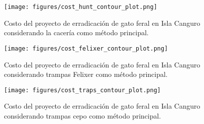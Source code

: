 \documentclass{article} %
\begin{document}
\begin{figure}[H]
\centering
\texttt{[image: figures/cost\_hunt\_contour\_plot.png]}
\caption{Costo del proyecto de erradicación de gato feral en Isla Canguro considerando la cacería
como método principal.}
\label{fig:cost_hunting_contour_plot}
\end{figure}

\begin{figure}[H]
\centering
\texttt{[image: figures/cost\_felixer\_contour\_plot.png]}
\caption{Costo del proyecto de erradicación de gato feral en Isla Canguro considerando trampas
Felixer como método principal.}
\label{fig:cost_felixer_plot}
\end{figure}

\begin{figure}[H]
\centering
\texttt{[image: figures/cost\_traps\_contour\_plot.png]}
\caption{Costo del proyecto de erradicación de gato feral en Isla Canguro considerando trampas
cepo como método principal.}
\label{fig:cost_tramps_contour_plot}
\end{figure}



\end{document}
